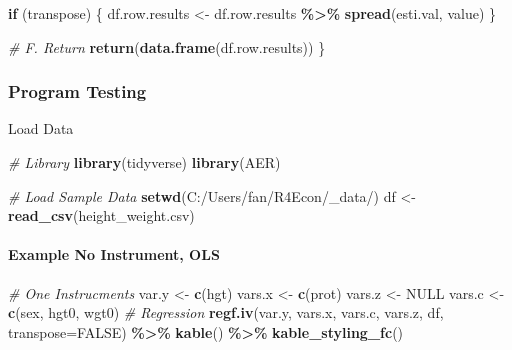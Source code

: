 \documentclass[
]{book}
\newenvironment{Shaded}{\begin{snugshade}}{\end{snugshade}}
\newcommand{\CommentTok}[1]{\textcolor[rgb]{0.56,0.35,0.01}{\textit{#1}}}
\newcommand{\ControlFlowTok}[1]{\textcolor[rgb]{0.13,0.29,0.53}{\textbf{#1}}}
\newcommand{\DataTypeTok}[1]{\textcolor[rgb]{0.13,0.29,0.53}{#1}}
\newcommand{\KeywordTok}[1]{\textcolor[rgb]{0.13,0.29,0.53}{\textbf{#1}}}
\newcommand{\NormalTok}[1]{#1}
\newcommand{\OperatorTok}[1]{\textcolor[rgb]{0.81,0.36,0.00}{\textbf{#1}}}
\newcommand{\OtherTok}[1]{\textcolor[rgb]{0.56,0.35,0.01}{#1}}
\newcommand{\StringTok}[1]{\textcolor[rgb]{0.31,0.60,0.02}{#1}}
\begin{document}
\begin{Shaded}
\begin{Highlighting}[]
  \ControlFlowTok{if}\NormalTok{ (transpose) \{}
\NormalTok{    df.row.results \textless{}{-}}\StringTok{ }\NormalTok{df.row.results }\OperatorTok{\%\textgreater{}\%}\StringTok{ }\KeywordTok{spread}\NormalTok{(esti.val, value)}
\NormalTok{  \}}
  
  \CommentTok{\# F. Return}
  \KeywordTok{return}\NormalTok{(}\KeywordTok{data.frame}\NormalTok{(df.row.results))}
\NormalTok{\}}
\end{Highlighting}
\end{Shaded}

\hypertarget{program-testing}{%
\subsubsection{Program Testing}\label{program-testing}}

Load Data

\begin{Shaded}
\begin{Highlighting}[]
\CommentTok{\# Library}
\KeywordTok{library}\NormalTok{(tidyverse)}
\KeywordTok{library}\NormalTok{(AER)}

\CommentTok{\# Load Sample Data}
\KeywordTok{setwd}\NormalTok{(}\StringTok{\textquotesingle{}C:/Users/fan/R4Econ/\_data/\textquotesingle{}}\NormalTok{)}
\NormalTok{df \textless{}{-}}\StringTok{ }\KeywordTok{read\_csv}\NormalTok{(}\StringTok{\textquotesingle{}height\_weight.csv\textquotesingle{}}\NormalTok{)}
\end{Highlighting}
\end{Shaded}

\hypertarget{example-no-instrument-ols}{%
\paragraph{Example No Instrument, OLS}\label{example-no-instrument-ols}}

\begin{Shaded}
\begin{Highlighting}[]
\CommentTok{\# One Instrucments}
\NormalTok{var.y \textless{}{-}}\StringTok{ }\KeywordTok{c}\NormalTok{(}\StringTok{\textquotesingle{}hgt\textquotesingle{}}\NormalTok{)}
\NormalTok{vars.x \textless{}{-}}\StringTok{ }\KeywordTok{c}\NormalTok{(}\StringTok{\textquotesingle{}prot\textquotesingle{}}\NormalTok{)}
\NormalTok{vars.z \textless{}{-}}\StringTok{ }\OtherTok{NULL}
\NormalTok{vars.c \textless{}{-}}\StringTok{ }\KeywordTok{c}\NormalTok{(}\StringTok{\textquotesingle{}sex\textquotesingle{}}\NormalTok{, }\StringTok{\textquotesingle{}hgt0\textquotesingle{}}\NormalTok{, }\StringTok{\textquotesingle{}wgt0\textquotesingle{}}\NormalTok{)}
\CommentTok{\# Regression}
\KeywordTok{regf.iv}\NormalTok{(var.y, vars.x, vars.c, vars.z, df, }\DataTypeTok{transpose=}\OtherTok{FALSE}\NormalTok{) }\OperatorTok{\%\textgreater{}\%}
\StringTok{  }\KeywordTok{kable}\NormalTok{() }\OperatorTok{\%\textgreater{}\%}
\StringTok{  }\KeywordTok{kable\_styling\_fc}\NormalTok{()}
\end{Highlighting}
\end{Shaded}
\end{document}
